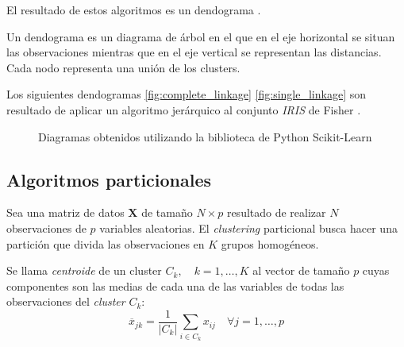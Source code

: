 \noindent El resultado de estos algoritmos es un dendograma \cite{Mardia 1979}.
\begin{defi}
Un dendograma es un diagrama de árbol en el que en el eje horizontal se situan las observaciones mientras que en el eje vertical se representan las distancias. Cada nodo representa una unión de los clusters. 
\end{defi}

\noindent Los siguientes dendogramas \ref{fig:complete_linkage} \ref{fig:single_linkage}  son resultado de aplicar un algoritmo jerárquico al conjunto \emph{IRIS} de Fisher \cite{Iris Fisher}.
\begin{figure}[h]
 \centering
 \caption{Diagramas obtenidos utilizando la biblioteca de Python Scikit-Learn}
 \label{fig:Dendogramas distintos enlaces }
\end{figure}
\newpage
\subsection{Algoritmos particionales}

\noindent Sea una matriz de datos $\mathbf{X}$ de tamaño $N\times p$ resultado de realizar $N$ observaciones de $p$ variables aleatorias. El \emph{clustering} particional busca hacer una partición que divida las observaciones en $K$ grupos homogéneos.

\begin{defi}
Se llama \emph{centroide} de un cluster $C_k,\quad k=1,\ldots,K$ al vector de tamaño $p$ cuyas componentes son las medias de cada una de las variables de todas las observaciones del \emph{cluster} $C_k$:
\begin{equation}
\overline{x}_{jk}=\dfrac{1}{|C_k|}\sum_{i\in C_k}  x_{ij} \quad \forall j=1,\ldots, p
\end{equation}
\end{defi}


